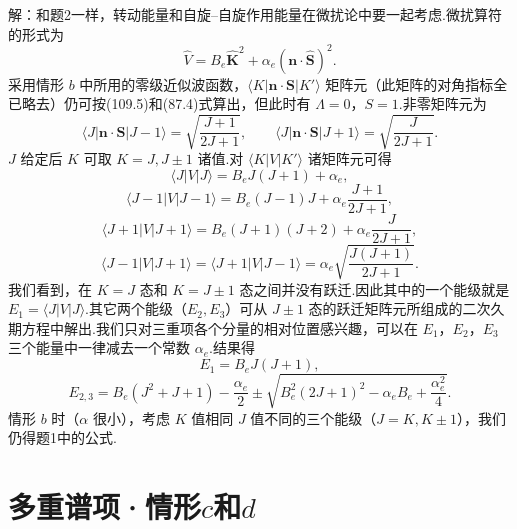 \begin{xiti}
解：和题2一样，转动能量和自旋–自旋作用能量在微扰论中要一起考虑.微扰算符的形式为
\begin{equation*}
  \hat{V}=B_e\hat{\boldsymbol{K}}^2+\alpha_e(\boldsymbol{n}\cdot\hat{\boldsymbol{S}})^2.
\end{equation*}
采用情形 $b$ 中所用的零级近似波函数，$\langle K|\boldsymbol{n}\cdot\boldsymbol{S}|K'\rangle$ 矩阵元（此矩阵的对角指标全已略去）仍可按(109.5)和(87.4)式算出，但此时有 $\Lambda=0$，$S=1$.非零矩阵元为
\begin{equation*}
  \langle J|\boldsymbol{n}\cdot\boldsymbol{S}|J-1\rangle=\sqrt{\frac{J+1}{2J+1}},\qquad
  \langle J|\boldsymbol{n}\cdot\boldsymbol{S}|J+1\rangle=\sqrt{\frac{J}{2J+1}}.
\end{equation*}
$J$ 给定后 $K$ 可取 $K=J,J\pm1$ 诸值.对 $\langle K|V|K'\rangle$ 诸矩阵元可得
\begin{equation*}
  \langle J|V|J\rangle=B_eJ(J+1)+\alpha_e,
\end{equation*}
\begin{equation*}
  \langle J-1|V|J-1\rangle=B_e(J-1)J+\alpha_e\frac{J+1}{2J+1},
\end{equation*}
\begin{equation*}
  \langle J+1|V|J+1\rangle=B_e(J+1)(J+2)+\alpha_e\frac{J}{2J+1},
\end{equation*}
\begin{equation*}
  \langle J-1|V|J+1\rangle=\langle J+1|V|J-1\rangle
  =\alpha_e\sqrt{\frac{J(J+1)}{2J+1}}.
\end{equation*}
我们看到，在 $K=J$ 态和 $K=J\pm1$ 态之间并没有跃迁.因此其中的一个能级就是 $E_1=\langle J|V|J\rangle$.其它两个能级（$E_2,E_3$）可从 $J\pm1$ 态的跃迁矩阵元所组成的二次久期方程中解出.我们只对三重项各个分量的相对位置感兴趣，可以在 $E_1$，$E_2$，$E_3$ 三个能量中一律减去一个常数 $\alpha_e$.结果得
\begin{equation*}
  E_1=B_eJ(J+1),
\end{equation*}
\begin{equation*}
  E_{2,3}=B_e(J^2+J+1)-\frac{\alpha_e}{2}
  \pm\sqrt{B_e^2(2J+1)^2-\alpha_eB_e+\frac{\alpha_e^2}{4}}.
\end{equation*}
情形 $b$ 时（$\alpha$ 很小），考虑 $K$ 值相同 $J$ 值不同的三个能级（$J=K,K\pm1$），我们仍得题1中的公式.

\end{xiti}

\section{多重谱项·情形\texorpdfstring{$c$}{c}和\texorpdfstring{$d$}{d}}

